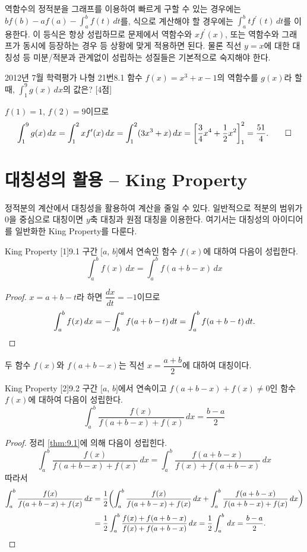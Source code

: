 \documentclass{article}
\begin{document}
역함수의 정적분을 그래프를 이용하여 빠르게 구할 수 있는 경우에는 $bf(b)-af(a)-\displaystyle\int_a^bf(t)\,dt$를, 식으로 계산해야 할 경우에는 $\displaystyle\int_a^btf^{\prime}(t)\,dt$를 이용한다. 이 등식은 항상 성립하므로 문제에서 역함수와 $xf^{\prime}(x)$, 또는 역함수와 그래프가 동시에 등장하는 경우 등 상황에 맞게 적용하면 된다.  물론 직선 $y=x$에 대한 대칭성 등 미분/적분과 관계없이 성립하는 성질들은 기본적으로 숙지해야 한다.

\begin{exc}{2012년 7월 학력평가 나형 21번}{8.1}
	함수 $f(x)=x^3+x-1$의 역함수를 $g(x)$라 할 때, $\displaystyle\int_1^9g(x)\,dx$의 값은? [4점]
\end{exc}

\begin{sol}
	$f(1)=1$, $f(2)=9$이므로
	\[
		\int _1^9g(x)\,dx=\int_1^2xf^{\prime}(x)\,dx=\int_1^2(3x^3+x)\,dx=\biggl[\frac{3}{4}x^4+\dfrac{1}{2}x^2\biggr]_1^2=\frac{51}{4}.\qed
	\]
\end{sol}

\section{대칭성의 활용 -- King Property}
정적분의 계산에서 대칭성을 활용하여 계산을 줄일 수 있다. 일반적으로 적분의 범위가 $0$을 중심으로 대칭이면 $y$축 대칭과 원점 대칭을 이용한다. 여기서는 대칭성의 아이디어를 일반화한 King Property를 다룬다.

\begin{thm}{King Property [1]}{9.1}
	구간 $[a$, $b]$에서 연속인 함수 $f(x)$에 대하여 다음이 성립한다.
	\[
		\int_a^bf(x)\,dx=\int_a^bf(a+b-x)\,dx
	\]
\end{thm}

\begin{proof}
	$x=a+b-t$라 하면 $\dfrac{dx}{dt}=-1$이므로
	\[
		\int_a^bf(x)\,dx=-\int_b^af(a+b-t)\,dt=\int_a^bf(a+b-t)\,dt.\qedhere
	\]
\end{proof}

\begin{remark}
	두 함수 $f(x)$와 $f(a+b-x)$는 직선 $x=\dfrac{a+b}{2}$에 대하여 대칭이다.
\end{remark}

\begin{thm}{King Property [2]}{9.2}
	구간 $[a$, $b]$에서 연속이고 $f(a+b-x)+f(x)\ne0$인 함수 $f(x)$에 대하여 다음이 성립한다.
	\[
		\int_a^b\frac{f(x)}{f(a+b-x)+f(x)}\,dx=\frac{b-a}{2}
	\]
\end{thm}

\begin{proof}
	정리 \ref{thm:9.1}에 의해 다음이 성립힌다.
	\[
		\int_a^b\frac{f(x)}{f(a+b-x)+f(x)}\,dx=\int_a^b\frac{f(a+b-x)}{f(x)+f(a+b-x)}\,dx
	\]
	따라서
	\begin{align*}
		\int_a^b\frac{f(x)}{f(a+b-x)+f(x)}\,dx&=\frac{1}{2}\biggl(\int_a^b\frac{f(x)}{f(a+b-x)+f(x)}\,dx+\int_a^b\frac{f(a+b-x)}{f(a+b-x)+f(x)}\,dx\biggr)\\[3pt]
		&=\frac{1}{2}\int_a^b\frac{f(x)+f(a+b-x)}{f(x)+f(a+b-x)}\,dx=\frac{1}{2}\int_a^b\,dx=\frac{b-a}{2}.\qedhere
	\end{align*}
\end{proof}
\end{document}
